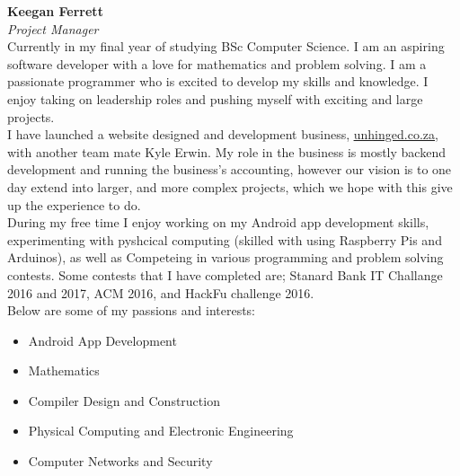 \textbf{Keegan Ferrett}\\
\textit{Project Manager}\\
    Currently in my final year of studying BSc Computer Science. I am an aspiring software developer with a love for mathematics and problem solving. I am a passionate programmer who is excited to develop my skills and knowledge. I enjoy taking on leadership roles and pushing myself with exciting and large projects. \\

    I have launched a website designed and development business, \href{www.unhinged.co.za}{\underline{unhinged.co.za}}, with another team mate Kyle Erwin. My role in the business is mostly backend development and running the business's accounting, however our vision is to one day extend into larger, and more complex projects, which we hope with this give up the experience to do.\\

    During my free time I enjoy working on my Android app development skills, experimenting with pyshcical computing (skilled with using Raspberry Pis and Arduinos), as well as Competeing in various programming and problem solving contests. Some contests that I have completed are; Stanard Bank IT Challange 2016 and 2017, ACM 2016, and HackFu challenge 2016.\\

    \noindent
    Below are some of my passions and interests:
    \begin{itemize}
        \item Android App Development
        \item Mathematics
        \item Compiler Design and Construction
        \item Physical Computing and Electronic Engineering
        \item Computer Networks and Security
    \end{itemize}


